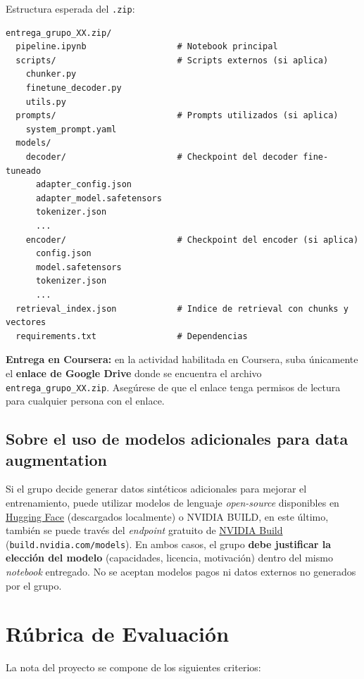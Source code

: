 \documentclass{article}
\begin{document}
\noindent Estructura esperada del \texttt{.zip}:
\begin{lstlisting}
entrega_grupo_XX.zip/
  pipeline.ipynb                  # Notebook principal
  scripts/                        # Scripts externos (si aplica)
    chunker.py
    finetune_decoder.py
    utils.py
  prompts/                        # Prompts utilizados (si aplica)
    system_prompt.yaml
  models/
    decoder/                      # Checkpoint del decoder fine-tuneado
      adapter_config.json
      adapter_model.safetensors
      tokenizer.json
      ...
    encoder/                      # Checkpoint del encoder (si aplica)
      config.json
      model.safetensors
      tokenizer.json
      ...
  retrieval_index.json            # Indice de retrieval con chunks y vectores
  requirements.txt                # Dependencias
\end{lstlisting}

\noindent \textbf{Entrega en Coursera:} en la actividad habilitada en Coursera, suba únicamente el \textbf{enlace de Google Drive} donde se encuentra el archivo \texttt{entrega\_grupo\_XX.zip}. Asegúrese de que el enlace tenga permisos de lectura para cualquier persona con el enlace.

\subsection{Sobre el uso de modelos adicionales para data augmentation}
Si el grupo decide generar datos sintéticos adicionales para mejorar el entrenamiento, puede utilizar modelos de lenguaje \textit{open-source} disponibles en \href{https://huggingface.co/}{Hugging Face} (descargados localmente) o NVIDIA BUILD, en este último, también se puede través del \textit{endpoint} gratuito de \href{https://build.nvidia.com/models}{NVIDIA Build} (\texttt{build.nvidia.com/models}). En ambos casos, el grupo \textbf{debe justificar la elección del modelo} (capacidades, licencia, motivación) dentro del mismo \textit{notebook} entregado. No se aceptan modelos pagos ni datos externos no generados por el grupo.


\section{Rúbrica de Evaluación}
La nota del proyecto se compone de los siguientes criterios:
\end{document}
